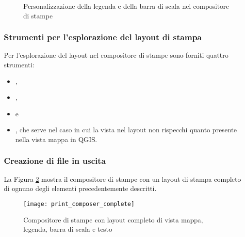 \begin{figure}[ht]
\centering
\caption{Personalizzazione della legenda e della barra di scala nel
compositore di stampe \nixcaption}\label{fig:print_composer_tab1}
   \goodgap
\end{figure}

\subsubsection{Strumenti per l'esplorazione del layout di stampa}

Per l'esplorazione del layout nel compositore di stampe sono forniti quattro
strumenti:

\begin{itemize}
\item {},
\item {},
\item {} e
\item {}, che serve nel caso in cui
la vista nel layout non rispecchi quanto presente nella vista mappa in QGIS. 
\end{itemize}

\subsubsection{Creazione di file in uscita}

La Figura \ref{fig:print_composer_complete} mostra il compositore di stampe
con un layout di stampa completo di ognuno degli elementi precedentemente
descritti.

\begin{figure}[h]
   \begin{center}
   \caption{Compositore di stampe con layout completo di vista mappa, legenda,
   barra di scala e testo \nixcaption}
   \label{fig:print_composer_complete}\smallskip
   \texttt{[image: print\_composer\_complete]}
\end{center}  
\end{figure}

